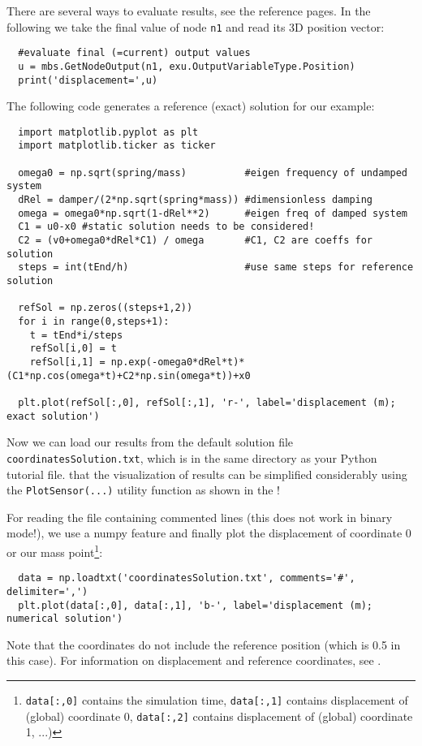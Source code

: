 There are several ways to evaluate results, see the reference pages. In the following we take the final value of node \texttt{n1} and read its 3D position vector:
\pythonstyle\begin{lstlisting}
  #evaluate final (=current) output values
  u = mbs.GetNodeOutput(n1, exu.OutputVariableType.Position)
  print('displacement=',u)
\end{lstlisting}
%
The following code generates a reference (exact) solution for our example:
\pythonstyle\begin{lstlisting}
  import matplotlib.pyplot as plt
  import matplotlib.ticker as ticker

  omega0 = np.sqrt(spring/mass)          #eigen frequency of undamped system
  dRel = damper/(2*np.sqrt(spring*mass)) #dimensionless damping
  omega = omega0*np.sqrt(1-dRel**2)      #eigen freq of damped system
  C1 = u0-x0 #static solution needs to be considered!
  C2 = (v0+omega0*dRel*C1) / omega       #C1, C2 are coeffs for solution
  steps = int(tEnd/h)                    #use same steps for reference solution

  refSol = np.zeros((steps+1,2))
  for i in range(0,steps+1):
    t = tEnd*i/steps
    refSol[i,0] = t
    refSol[i,1] = np.exp(-omega0*dRel*t)*(C1*np.cos(omega*t)+C2*np.sin(omega*t))+x0

  plt.plot(refSol[:,0], refSol[:,1], 'r-', label='displacement (m); exact solution')
\end{lstlisting}
%
Now we can load our results from the default solution file \texttt{coordinatesSolution.txt}, which is in the same
directory as your Python tutorial file. 
 that the visualization of results can be simplified considerably using the \texttt{PlotSensor(...)} utility function as shown in the !

For reading the file containing commented lines (this does not work in binary mode!), we use a numpy feature and finally plot the displacement of coordinate 0 or our mass point\footnote{\texttt{data[:,0]} contains the simulation time, \texttt{data[:,1]} contains displacement of (global) coordinate 0, \texttt{data[:,2]} contains displacement of (global) coordinate 1, ...)}:
\pythonstyle\begin{lstlisting}
  data = np.loadtxt('coordinatesSolution.txt', comments='#', delimiter=',')
  plt.plot(data[:,0], data[:,1], 'b-', label='displacement (m); numerical solution') 
\end{lstlisting}
Note that the coordinates do not include the reference position (which is 0.5 in this case). For information on displacement and reference coordinates, see .

